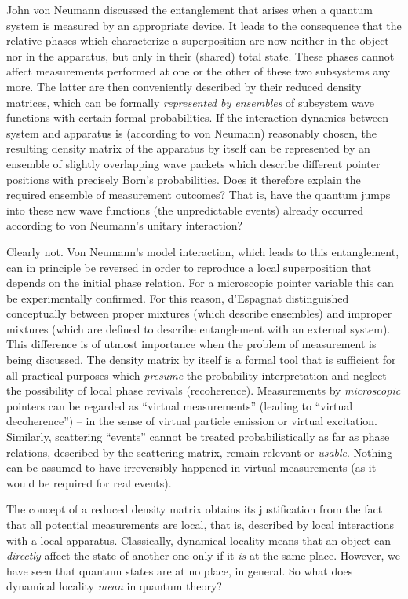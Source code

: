 \documentclass[12pt]{article}
\begin{document}
John von Neumann discussed the entanglement that arises when a quantum
system is measured by an appropriate device. It leads to the
consequence that the relative phases which characterize a
superposition are now neither in the object nor in the apparatus, but
only in their (shared) total state. These phases cannot affect
measurements performed at one or the other of these two subsystems any
more. The latter are then conveniently described by their reduced
density matrices, which can be formally {\it represented by ensembles}
of subsystem wave functions with certain formal probabilities. If the
interaction dynamics between system and apparatus is (according to von
Neumann) reasonably chosen, the resulting density matrix of the
apparatus by itself can be represented by an ensemble of slightly
overlapping wave packets which describe different pointer positions
with precisely Born's probabilities. Does it therefore explain the
required ensemble of measurement outcomes? That is, have the quantum
jumps into these new wave functions (the unpredictable events) already
occurred according to von Neumann's unitary interaction?

Clearly not. Von Neumann's model
interaction, which leads to this entanglement, can in principle be
reversed in order to reproduce a local superposition that depends on
the initial phase relation. For a microscopic pointer variable this
can be experimentally confirmed. For this reason,
d'Espagnat \cite{dE} distinguished conceptually between proper
mixtures (which describe ensembles) and improper mixtures (which are
defined to describe entanglement with an external system). This
difference is of utmost importance when the problem of measurement is
being discussed. The density matrix by itself is a formal tool that is
sufficient for all practical purposes which {\it presume} the
probability interpretation and neglect the possibility of local phase
revivals (recoherence). Measurements by {\it microscopic} pointers can
be regarded as ``virtual measurements'' (leading to ``virtual
decoherence'') -- in the sense of virtual particle
emission or virtual excitation. Similarly, scattering ``events''
cannot be treated probabilistically as far as phase relations,
described by the scattering matrix, remain relevant or {\it usable}.
Nothing can be assumed to have irreversibly happened in virtual
measurements (as it would be required for real events).

The concept of a reduced density matrix obtains its justification from
the fact that all potential measurements are local, that is,
described by local interactions with a local apparatus. Classically,
dynamical locality means that an object can {\it directly} affect the
state of another one only if it {\it is} at the same place. However,
we have seen that quantum states are at no place, in general. So what
does dynamical locality {\it mean} in quantum theory?
\end{document}
